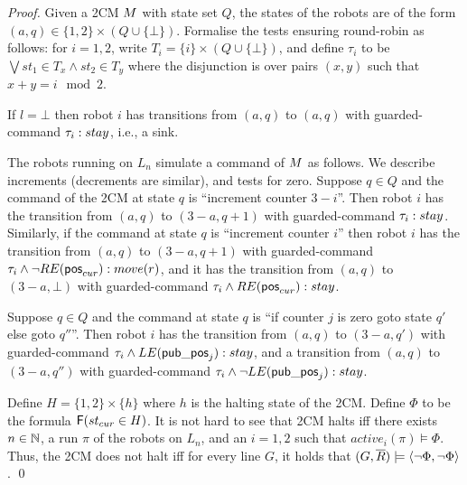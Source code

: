 \begin{proof}
Given a 2CM $M$ with state set $Q$, the states of the robots are of the form $(a,q) \in \{1,2\} \times (Q \cup \{\bot\})$. 
Formalise the tests ensuring round-robin as follows: for $i = 1,2$, write $T_i = \{i\} \times (Q \cup \{\bot\})$, and 
define $\tau_i$ to be $\bigvee st_1 \in T_x \wedge st_2 \in T_y$ where the disjunction is over pairs $(x,y)$ such that $x+y = i \mod 2$.

If $l = \bot$ then robot $i$ has transitions from $(a,q)$ to $(a,q)$ with guarded-command $\tau_i:stay$, i.e., a sink.  

The robots running on $L_n$ simulate a command of $M$ as follows. We describe increments (decrements are similar), and tests for zero.
Suppose $q \in Q$ and the command of the 2CM at state $q$ is ``increment counter $3-i$''. Then robot $i$ has the transition from $(a,q)$ to $(3-a,q+1)$ with guarded-command $\tau_i:stay$. Similarly, if the command at state $q$ is ``increment counter $i$'' then robot $i$ has the transition from $(a,q)$ to $(3-a,q+1)$ with guarded-command $\tau_i \wedge \neg RE(\mathsf{pos}_{cur}):move(r)$, and it has the transition from $(a,q)$ to $(3-a,\bot)$ with guarded-command $\tau_i \wedge RE(\mathsf{pos}_{cur}):stay$. 


Suppose $q \in Q$ and the command at state $q$ is ``if counter $j$ is zero goto state $q'$ else goto $q''$''. Then robot $i$ has the transition from $(a,q)$ to $(3-a,q')$ with guarded-command $\tau_i \wedge LE(\mathsf{pub\_pos}_j):stay$, and a transition from $(a,q)$ to $(3-a,q'')$ with guarded-command $\tau_i \wedge \neg LE(\mathsf{pub\_pos}_j):stay$. 

Define $H = \{1,2\} \times \{h\}$ where $h$ is the halting state of the 2CM. Define $\Phi$ to be the formula $\operatorname{\mathsf{F}} (st_{cur} \in H)$.
It is not hard to see that 2CM halts iff there exists $n \in \mathbb{N}$, a run $\pi$ of the robots on $L_n$, and an $i = 1,2$ such that $active_i(\pi) \models \Phi$. Thus, the 2CM does not halt iff for every line $G$, it holds that $(G,\overline{R}) \models \langle {\neg \Phi,\neg \Phi} \rangle$. \qed
\end{proof}





